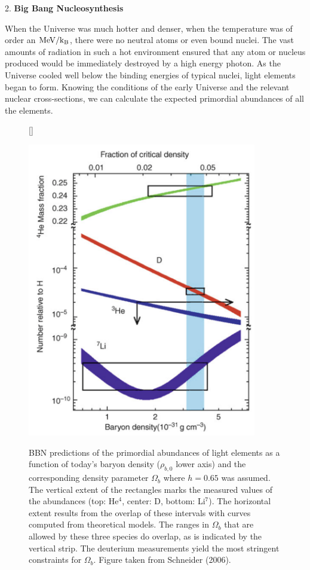 \documentclass[a4paper,11pt]{article}
\begin{document}
{\noindent}2. \textbf{Big Bang Nucleosynthesis}

{\noindent}When the Universe was much hotter and denser, when the temperature was of order an ${\rm MeV/k_B}$, there were no neutral atoms or even bound nuclei. The vast amounts of radiation in such a hot environment ensured that any atom or nucleus produced would be immediately destroyed by a high energy photon. As the Universe cooled well below the binding energies of typical nuclei, light elements began to form. Knowing the conditions of the early Universe and the relevant nuclear cross-sections, we can calculate the expected primordial abundances of all the elements.

\begin{figure}[h]
    [\FBwidth]
    {\caption{\footnotesize{BBN predictions of the primordial abundances of light elements as a function of today’s baryon density ($\rho_{b,0}$ lower axis) and the corresponding density parameter $\Omega_b$ where $h=0.65$ was assumed. The vertical extent of the rectangles marks the measured values of the abundances (top: He$^4$, center: D, bottom: Li$^7$). The horizontal extent results from the overlap of these intervals with curves computed from theoretical models. The ranges in $\Omega_b$ that are allowed by these three species do overlap, as is indicated by the vertical strip. The deuterium measurements yield the most stringent constraints for $\Omega_b$. Figure taken from Schneider (2006).}}
    \label{fig:bbn_prediction}}
    {\includegraphics[width=10cm]{figures/BBN_prediction.png}}
\end{figure}
\end{document}
